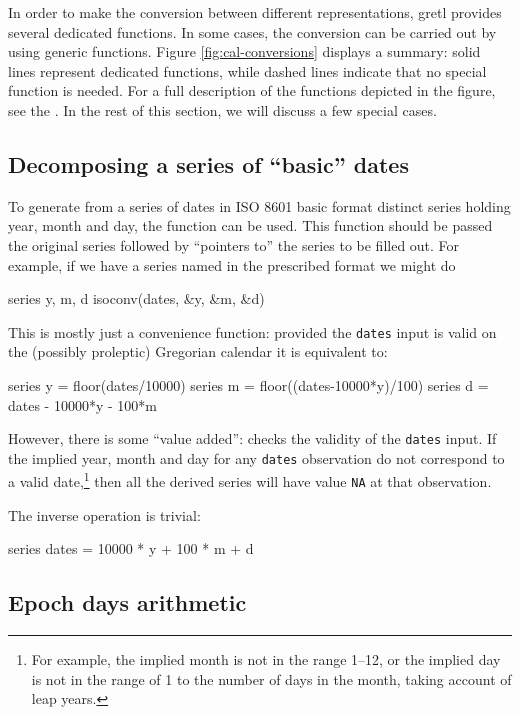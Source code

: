 In order to make the conversion between different representations,
gretl provides several dedicated functions. In some cases, the
conversion can be carried out by using generic functions. Figure
\ref{fig:cal-conversions} displays a summary: solid lines represent
dedicated functions, while dashed lines indicate that no special
function is needed. For a full description of the functions depicted
in the figure, see the \GCR. In the rest of this section, we will
discuss a few special cases.

\subsection{Decomposing a series of ``basic'' dates}

To generate from a series of dates in ISO 8601 basic format distinct
series holding year, month and day, the function  can
be used. This function should be passed the original series followed
by ``pointers to'' the series to be filled out. For example, if we
have a series named  in the prescribed format we might
do
%
\begin{code}
series y, m, d
isoconv(dates, &y, &m, &d)
\end{code}

This is mostly just a convenience function: provided the
\texttt{dates} input is valid on the (possibly proleptic) Gregorian
calendar it is equivalent to:
%
\begin{code}
series y = floor(dates/10000)
series m = floor((dates-10000*y)/100)
series d = dates - 10000*y - 100*m
\end{code}

However, there is some ``value added'':  checks the
validity of the \texttt{dates} input. If the implied year, month and
day for any \texttt{dates} observation do not correspond to a valid
date,\footnote{For example, the implied month is not in the range
  1--12, or the implied day is not in the range of 1 to the number of
  days in the month, taking account of leap years.} then all the
derived series will have value \texttt{NA} at that observation.

The inverse operation is trivial:
\begin{code}
series dates = 10000 * y + 100 * m + d
\end{code}

\subsection{Epoch days arithmetic}

